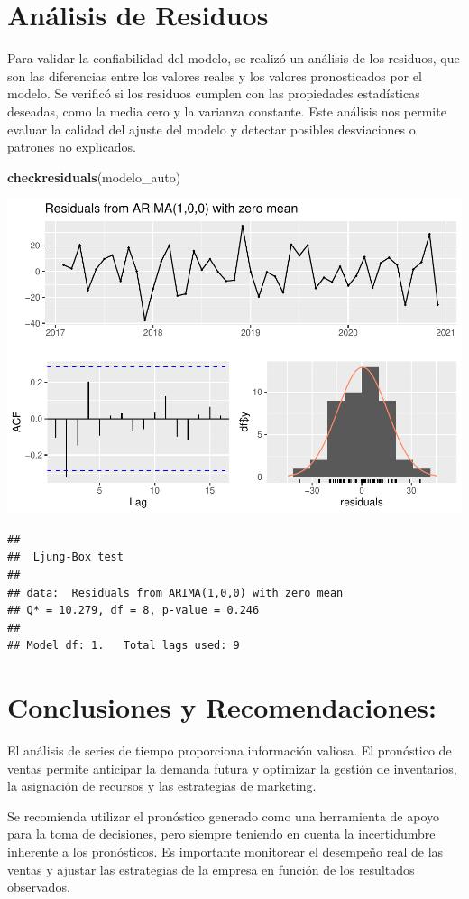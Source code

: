 \documentclass[
]{book}
\newenvironment{Shaded}{\begin{snugshade}}{\end{snugshade}}
\newcommand{\FunctionTok}[1]{\textcolor[rgb]{0.13,0.29,0.53}{\textbf{#1}}}
\newcommand{\NormalTok}[1]{#1}
\begin{document}
\section{\texorpdfstring{\textbf{Análisis de Residuos}}{Análisis de Residuos}}\label{anuxe1lisis-de-residuos}

Para validar la confiabilidad del modelo, se realizó un análisis de los residuos, que son las diferencias entre los valores reales y los valores pronosticados por el modelo. Se verificó si los residuos cumplen con las propiedades estadísticas deseadas, como la media cero y la varianza constante. Este análisis nos permite evaluar la calidad del ajuste del modelo y detectar posibles desviaciones o patrones no explicados.

\begin{Shaded}
\begin{Highlighting}[]
\FunctionTok{checkresiduals}\NormalTok{(modelo\_auto)}
\end{Highlighting}
\end{Shaded}

\includegraphics{_main_files/figure-latex/unnamed-chunk-32-1.pdf}

\begin{verbatim}
## 
##  Ljung-Box test
## 
## data:  Residuals from ARIMA(1,0,0) with zero mean
## Q* = 10.279, df = 8, p-value = 0.246
## 
## Model df: 1.   Total lags used: 9
\end{verbatim}

\section{\texorpdfstring{\textbf{Conclusiones y Recomendaciones:}}{Conclusiones y Recomendaciones:}}\label{conclusiones-y-recomendaciones-1}

El análisis de series de tiempo proporciona información valiosa. El pronóstico de ventas permite anticipar la demanda futura y optimizar la gestión de inventarios, la asignación de recursos y las estrategias de marketing.

Se recomienda utilizar el pronóstico generado como una herramienta de apoyo para la toma de decisiones, pero siempre teniendo en cuenta la incertidumbre inherente a los pronósticos. Es importante monitorear el desempeño real de las ventas y ajustar las estrategias de la empresa en función de los resultados observados.

  
\end{document}

